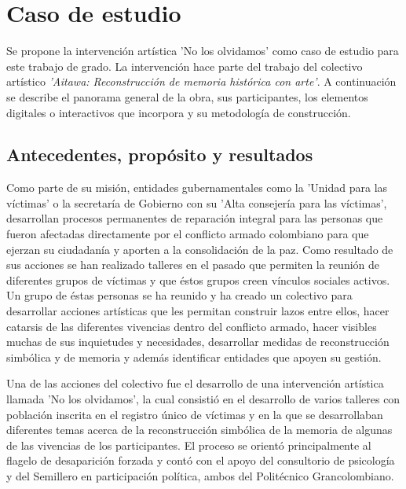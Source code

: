 
\chapter{Caso de estudio}
\label{Caso_de_estudio}

Se propone la intervención artística 'No los olvidamos' como caso de estudio para este trabajo de grado. La intervención hace parte del trabajo del colectivo artístico \textit{'Aitawa: Reconstrucción de memoria histórica con arte'}. A continuación se describe el panorama general de la obra, sus participantes, los elementos digitales o interactivos que incorpora y su metodología de construcción.

\section{Antecedentes, propósito y resultados}

Como parte de su misión, entidades gubernamentales como la 'Unidad para las víctimas' o la secretaría de Gobierno con su 'Alta consejería para las víctimas', desarrollan procesos permanentes de reparación integral para las personas que fueron afectadas directamente por el conflicto armado colombiano para que ejerzan su ciudadanía y aporten a la consolidación de la paz. Como resultado de sus acciones se han realizado talleres en el pasado que permiten la reunión de diferentes grupos de víctimas y que éstos grupos creen vínculos sociales activos. Un grupo de éstas personas se ha reunido y ha creado un colectivo para desarrollar acciones artísticas que les permitan construir lazos entre ellos, hacer catarsis de las diferentes vivencias dentro del conflicto armado, hacer visibles muchas de sus inquietudes y necesidades, desarrollar medidas de reconstrucción simbólica y de memoria y además identificar entidades que apoyen su gestión.

Una de las acciones del colectivo fue el desarrollo de una intervención artística llamada 'No los olvidamos', la cual consistió en el desarrollo de varios talleres con población inscrita en el registro único de víctimas y en la que se desarrollaban diferentes temas acerca de la reconstrucción simbólica de la memoria de algunas de las vivencias de los participantes. El proceso se orientó principalmente al flagelo de desaparición forzada y contó con el apoyo del consultorio de psicología y del Semillero en participación política, ambos del Politécnico Grancolombiano.


